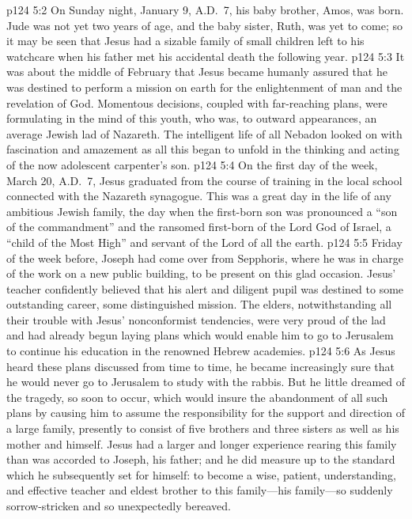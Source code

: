 \vs p124 5:2 On Sunday night, January 9, A.D.~7, his baby brother, Amos, was born. Jude was not yet two years of age, and the baby sister, Ruth, was yet to come; so it may be seen that Jesus had a sizable family of small children left to his watchcare when his father met his accidental death the following year.
\pc \vs p124 5:3 It was about the middle of February that Jesus became humanly assured that he was destined to perform a mission on earth for the enlightenment of man and the revelation of God. Momentous decisions, coupled with far\hyp{}reaching plans, were formulating in the mind of this youth, who was, to outward appearances, an average Jewish lad of Nazareth. The intelligent life of all Nebadon looked on with fascination and amazement as all this began to unfold in the thinking and acting of the now adolescent carpenter’s son.
\pc \vs p124 5:4 On the first day of the week, March 20, A.D.~7, Jesus graduated from the course of training in the local school connected with the Nazareth synagogue. This was a great day in the life of any ambitious Jewish family, the day when the first\hyp{}born son was pronounced a “son of the commandment” and the ransomed first\hyp{}born of the Lord God of Israel, a “child of the Most High” and servant of the Lord of all the earth.
\vs p124 5:5 Friday of the week before, Joseph had come over from Sepphoris, where he was in charge of the work on a new public building, to be present on this glad occasion. Jesus’ teacher confidently believed that his alert and diligent pupil was destined to some outstanding career, some distinguished mission. The elders, notwithstanding all their trouble with Jesus’ nonconformist tendencies, were very proud of the lad and had already begun laying plans which would enable him to go to Jerusalem to continue his education in the renowned Hebrew academies.\plusone
\vs p124 5:6 As Jesus heard these plans discussed from time to time, he became increasingly sure that he would never go to Jerusalem to study with the rabbis. But he little dreamed of the tragedy, so soon to occur, which would insure the abandonment of all such plans by causing him to assume the responsibility for the support and direction of a large family, presently to consist of five brothers and three sisters as well as his mother and himself. Jesus had a larger and longer experience rearing this family than was accorded to Joseph, his father; and he did measure up to the standard which he subsequently set for himself: to become a wise, patient, understanding, and effective teacher and eldest brother to this family---his family---so suddenly sorrow\hyp{}stricken and so unexpectedly bereaved.
